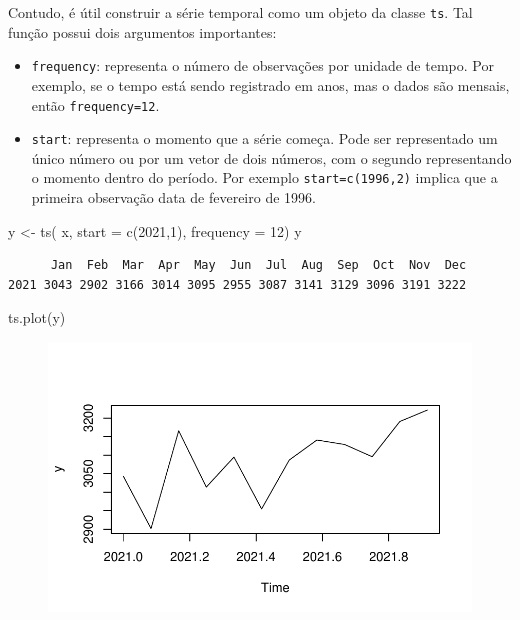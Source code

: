 \documentclass[
  letterpaper,
  DIV=11,
  numbers=noendperiod]{scrreprt}
\newenvironment{Shaded}{\begin{snugshade}}{\end{snugshade}}
\newcommand{\AttributeTok}[1]{\textcolor[rgb]{0.40,0.45,0.13}{#1}}
\newcommand{\DecValTok}[1]{\textcolor[rgb]{0.68,0.00,0.00}{#1}}
\newcommand{\FunctionTok}[1]{\textcolor[rgb]{0.28,0.35,0.67}{#1}}
\newcommand{\NormalTok}[1]{\textcolor[rgb]{0.00,0.23,0.31}{#1}}
\newcommand{\OtherTok}[1]{\textcolor[rgb]{0.00,0.23,0.31}{#1}}
\begin{document}
Contudo, é útil construir a série temporal como um objeto da classe
\texttt{ts}. Tal função possui dois argumentos importantes:

\begin{itemize}
\item
  \texttt{frequency}: representa o número de observações por unidade de
  tempo. Por exemplo, se o tempo está sendo registrado em anos, mas o
  dados são mensais, então \texttt{frequency=12}.
\item
  \texttt{start}: representa o momento que a série começa. Pode ser
  representado um único número ou por um vetor de dois números, com o
  segundo representando o momento dentro do período. Por exemplo
  \texttt{start=c(1996,2)} implica que a primeira observação data de
  fevereiro de 1996.
\end{itemize}

\begin{Shaded}
\begin{Highlighting}[]
\NormalTok{y }\OtherTok{\textless{}{-}} \FunctionTok{ts}\NormalTok{( x, }\AttributeTok{start =} \FunctionTok{c}\NormalTok{(}\DecValTok{2021}\NormalTok{,}\DecValTok{1}\NormalTok{), }\AttributeTok{frequency =} \DecValTok{12}\NormalTok{)}
\NormalTok{y}
\end{Highlighting}
\end{Shaded}

\begin{verbatim}
      Jan  Feb  Mar  Apr  May  Jun  Jul  Aug  Sep  Oct  Nov  Dec
2021 3043 2902 3166 3014 3095 2955 3087 3141 3129 3096 3191 3222
\end{verbatim}

\begin{Shaded}
\begin{Highlighting}[]
\FunctionTok{ts.plot}\NormalTok{(y)}
\end{Highlighting}
\end{Shaded}

\begin{figure}[H]

{\centering \includegraphics{intro_files/figure-pdf/unnamed-chunk-2-1.pdf}

}

\end{figure}
\end{document}
